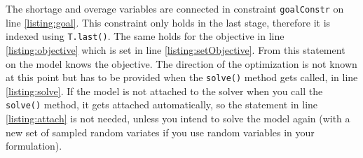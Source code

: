 \documentclass[a4paper,10pt,pdftex]{scrartcl}
\begin{document}
The shortage and overage variables are connected in constraint \lstinline|goalConstr| on line \ref{listing:goal}. This constraint only holds in the last stage, therefore it is indexed using \lstinline|T.last()|. The same holds for the objective in line \ref{listing:objective} which is set in line \ref{listing:setObjective}.
From this statement on the model knows the objective. The direction of the optimization is not known at this point but has to be provided when the \lstinline|solve()| method gets called, in line \ref{listing:solve}. If the model is not attached to the solver when you call the \lstinline|solve()| method, it gets attached automatically, so the statement in line \ref{listing:attach} is not needed, unless you intend to solve the model again (with a new set of sampled random variates if you use random variables in your formulation). 
\end{document}
